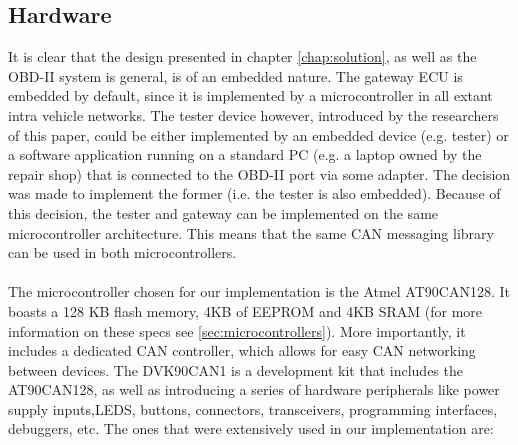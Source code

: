 \subsection{Hardware}
\label{sec:hardware}
It is clear that the design presented in chapter \ref{chap:solution}, as well as the OBD-II system is general, is of an embedded nature. The gateway ECU is embedded by default, since it is implemented by a microcontroller in all extant intra vehicle networks. The tester device however, introduced by the researchers of this paper, could be either implemented by an embedded device (e.g. tester) or a software application running on a standard PC (e.g. a laptop owned by the repair shop) that is connected to the OBD-II port via some adapter. The decision was made to implement the former (i.e. the tester is also embedded). Because of this decision, the tester and gateway can be implemented on the same microcontroller architecture. This means that the same CAN messaging library can be used in both microcontrollers. \\ \\ The microcontroller chosen for our implementation is the Atmel AT90CAN128. It boasts a 128 KB flash memory, 4KB of EEPROM and 4KB SRAM (for more information on these specs see \ref{sec:microcontrollers}). More importantly, it includes a dedicated CAN controller, which allows for easy CAN networking between devices. The DVK90CAN1 is a development kit that includes the AT90CAN128, as well as introducing a series of hardware peripherals like power supply inputs,LEDS, buttons, connectors, transceivers, programming interfaces, debuggers, etc. The ones that were extensively used in our implementation are:
